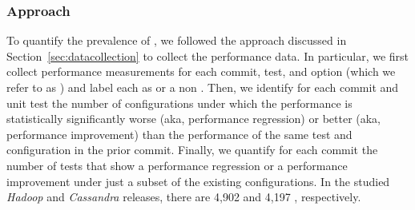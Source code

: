  
\subsubsection*{Approach}
To quantify the prevalence of \inconsistent, we followed the approach discussed in Section~\ref{sec:datacollection} to collect the performance data. In particular, we first collect performance measurements for each commit, test, and option (which we refer to as \textbf{\instance}) and label each \instance as \inconsistent or a non \inconsistent. %
Then, we identify for each commit and unit test the number of configurations under which the performance is statistically significantly worse (aka, performance regression) or better (aka, performance improvement) than the performance of the same test and configuration in the prior commit. Finally, we quantify for each commit the number of tests that show a performance regression or a performance improvement under just a subset of the existing configurations. 
In the studied \emph{Hadoop} and \emph{Cassandra} releases, there are 4,902 and 4,197 \instance, respectively. 




